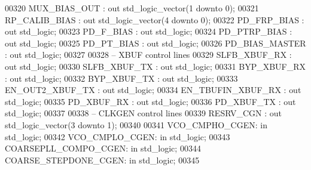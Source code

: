 \begin{DoxyCode}
00320         MUX\_BIAS\_OUT        : \textcolor{keywordflow}{out} \textcolor{comment}{std\_logic\_vector}(\textcolor{vhdllogic}{}\textcolor{vhdllogic}{1} \textcolor{keywordflow}{downto} \textcolor{vhdllogic}{}\textcolor{vhdllogic}{0});
00321         RP\_CALIB\_BIAS       : \textcolor{keywordflow}{out} \textcolor{comment}{std\_logic\_vector}(\textcolor{vhdllogic}{}\textcolor{vhdllogic}{4} \textcolor{keywordflow}{downto} \textcolor{vhdllogic}{}\textcolor{vhdllogic}{0});
00322         PD\_FRP\_BIAS         : \textcolor{keywordflow}{out} \textcolor{comment}{std\_logic};
00323         PD\_F\_BIAS               : \textcolor{keywordflow}{out} \textcolor{comment}{std\_logic};
00324         PD\_PTRP\_BIAS        : \textcolor{keywordflow}{out} \textcolor{comment}{std\_logic};
00325         PD\_PT\_BIAS          : \textcolor{keywordflow}{out} \textcolor{comment}{std\_logic};
00326         PD\_BIAS\_MASTER  : \textcolor{keywordflow}{out} \textcolor{comment}{std\_logic};
00327         
00328 \textcolor{keyword}{        -- XBUF control lines}
00329         SLFB\_XBUF\_RX            : \textcolor{keywordflow}{out} \textcolor{comment}{std\_logic};
00330         SLFB\_XBUF\_TX            : \textcolor{keywordflow}{out} \textcolor{comment}{std\_logic};
00331         BYP\_XBUF\_RX             : \textcolor{keywordflow}{out} \textcolor{comment}{std\_logic};
00332         BYP\_XBUF\_TX             : \textcolor{keywordflow}{out} \textcolor{comment}{std\_logic};
00333         EN\_OUT2\_XBUF\_TX     : \textcolor{keywordflow}{out} \textcolor{comment}{std\_logic};
00334         EN\_TBUFIN\_XBUF\_RX   : \textcolor{keywordflow}{out} \textcolor{comment}{std\_logic};
00335         PD\_XBUF\_RX              : \textcolor{keywordflow}{out} \textcolor{comment}{std\_logic};
00336         PD\_XBUF\_TX              : \textcolor{keywordflow}{out} \textcolor{comment}{std\_logic};
00337 
00338 \textcolor{keyword}{        -- CLKGEN control lines     }
00339         RESRV\_CGN                       : \textcolor{keywordflow}{out} \textcolor{comment}{std\_logic\_vector}(\textcolor{vhdllogic}{}\textcolor{vhdllogic}{3} \textcolor{keywordflow}{downto} \textcolor{vhdllogic}{}\textcolor{vhdllogic}{1});
00340         
00341         VCO\_CMPHO\_CGEN: \textcolor{keywordflow}{in} \textcolor{comment}{std\_logic};
00342         VCO\_CMPLO\_CGEN: \textcolor{keywordflow}{in} \textcolor{comment}{std\_logic};
00343         COARSEPLL\_COMPO\_CGEN:   \textcolor{keywordflow}{in} \textcolor{comment}{std\_logic};
00344         COARSE\_STEPDONE\_CGEN:   \textcolor{keywordflow}{in} \textcolor{comment}{std\_logic};
00345         

\end{DoxyCode}
